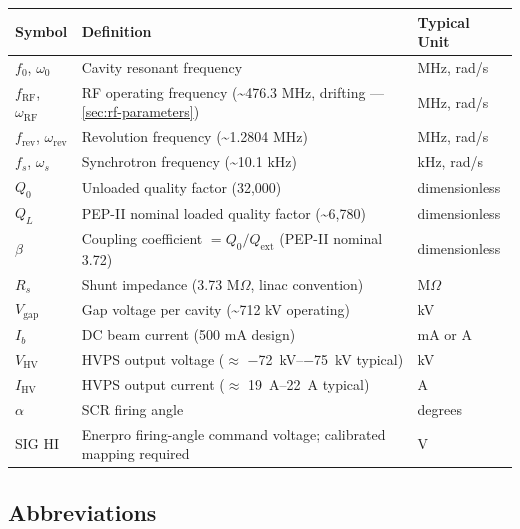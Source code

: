 \begin{longtable}[]{@{}lll@{}}
\toprule\noalign{}
Symbol & Definition & Typical Unit \\
\midrule\noalign{}
\endhead
\bottomrule\noalign{}
\endlastfoot
$f_0$, $\omega_0$ & Cavity resonant frequency & MHz, rad/s \\
$f_\text{RF}$, $\omega_\text{RF}$ & RF operating frequency (\textasciitilde476.3 MHz, drifting --- \cref{sec:rf-parameters}) & MHz, rad/s \\
$f_\text{rev}$, $\omega_\text{rev}$ & Revolution frequency (\textasciitilde1.2804 MHz) & MHz, rad/s \\
$f_s$, $\omega_s$ & Synchrotron frequency (\textasciitilde10.1 kHz) & kHz, rad/s \\
$Q_0$ & Unloaded quality factor (32,000) & dimensionless \\
$Q_L$ & PEP-II nominal loaded quality factor (\textasciitilde6,780) & dimensionless \\
$\beta$ & Coupling coefficient $= Q_0/Q_\text{ext}$ (PEP-II nominal 3.72) & dimensionless \\
$R_s$ & Shunt impedance (3.73 M$\Omega$, linac convention) & M$\Omega$ \\
$V_\text{gap}$ & Gap voltage per cavity (\textasciitilde712 kV operating) & kV \\
$I_b$ & DC beam current (500 mA design) & mA or A \\
$V_\text{HV}$ & HVPS output voltage ($\approx$ \qtyrange{-72}{-75}{\kilo\volt} typical) & kV \\
$I_\text{HV}$ & HVPS output current ($\approx$ \qtyrange{19}{22}{\ampere} typical) & A \\
$\alpha$ & SCR firing angle & degrees \\
SIG HI & Enerpro firing-angle command voltage; calibrated mapping required & V \\
\end{longtable}

\subsection{Abbreviations}\label{b2-abbreviations}

